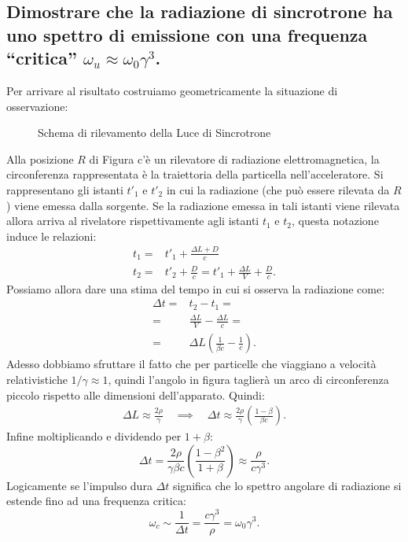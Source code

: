\subsection[]{Dimostrare che la radiazione di sincrotrone ha uno spettro di emissione con una frequenza “critica” $\omega_{u}\approx \omega_0\gamma^3$.}
\label{sec:3.b.16}
Per arrivare al risultato costruiamo geometricamente la situazione di osservazione:
\begin{figure}[ht]
    \centering
    \caption{Schema di rilevamento della Luce di Sincrotrone}
    \label{fig:luce-sincrotrone}
\end{figure}
Alla posizione $R$ di Figura c'è un rilevatore di radiazione elettromagnetica, la circonferenza rappresentata è la traiettoria della particella nell'acceleratore. Si rappresentano gli istanti $t'_{1}$ e $t'_{2}$ in cui la radiazione (che può essere rilevata da $R$) viene emessa dalla sorgente. Se la radiazione emessa in tali istanti viene rilevata allora arriva al rivelatore rispettivamente agli istanti $t_{1}$ e $t_{2}$, questa notazione induce le relazioni:
\begin{align*}
	t_1 =& t'_{1}+ \frac{\Delta L + D}{c}\\
	t_2=& t'_{2}+ \frac{D}{c}=t'_{1}+ \frac{\Delta L}{V}+ \frac{D}{c}
.\end{align*}
Possiamo allora dare una stima del tempo in cui si osserva la radiazione come:
\begin{align*}
	\Delta t =& t_2-t_1 =\\
	=&\frac{\Delta L}{V}- \frac{\Delta L}{c}=\\
	=& \Delta L \left( \frac{1}{\beta c} - \frac{1}{c} \right) 
.\end{align*}
Adesso dobbiamo sfruttare il fatto che per particelle che viaggiano a velocità relativistiche $1 /\gamma \approx 1$, quindi l'angolo in figura taglierà un arco di circonferenza piccolo rispetto alle dimensioni dell'apparato. Quindi:
\begin{align*}
	\Delta L \approx \frac{2 \rho}{\gamma} \quad \implies \quad  \Delta t \approx \frac{2\rho}{\gamma}\left( \frac{1-\beta}{\beta c} \right) 
.\end{align*}
Infine moltiplicando e dividendo per $1+\beta$:
\[
	\Delta t = \frac{2 \rho}{\gamma \beta c} \left( \frac{1-\beta^2}{1+\beta} \right)\approx \frac{\rho}{c \gamma^3} 
.\] 
Logicamente se l'impulso dura $\Delta t$ significa che lo spettro angolare di radiazione si estende fino ad una frequenza critica:
\[
	\omega_{c} \sim \frac{1}{\Delta t} = \frac{c\gamma^3}{\rho}= \omega_0\gamma^3
.\] 

